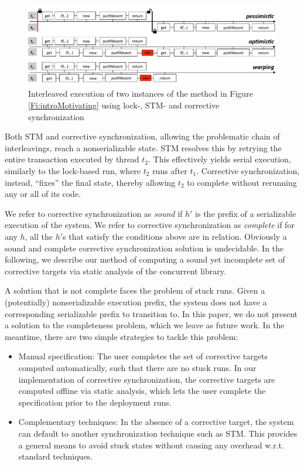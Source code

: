 \begin{figure}
	\begin{center}
	\includegraphics[width=\textwidth]{OverviewSlide.pdf}
	\end{center}
	\caption{\label{Fi:motivatingOverview}Interleaved execution of two instances of the method in Figure \ref{Fi:introMotivating} using lock-, STM- and corrective synchronization}
\end{figure}

Both STM and corrective synchronization, allowing the problematic chain of interleavings, reach a nonserializable state. STM resolves this by retrying the entire transaction executed by thread $t_2$. This effectively yields serial execution, similarly to the lock-based run, where $t_2$ runs after $t_1$. Corrective synchronization, instead, ``fixes'' the final state, thereby allowing $t_2$ to complete without rerunning any or all of its code.

We refer to corrective synchronization as \emph{sound} if $h'$ is the prefix of a serializable execution of the system. We refer to corrective synchronization as \emph{complete} if for any $h$, all the $h'$s that satisfy the conditions above are in relation. Obviously a sound and complete corrective synchronization solution is undecidable. In the following, we describe our method of computing a sound yet incomplete set of corrective targets via static analysis of the concurrent library.

A solution that is not complete faces the problem of stuck runs. Given a (potentially) nonserializable execution prefix, the system does not have a corresponding serializable prefix to transition to. In this paper, we do not present a solution to the completeness problem, which we leave as future work. In the meantime, there are two simple strategies to tackle this problem:
\begin{itemize}
	\item Manual specification: The user completes the set of corrective targets computed automatically, such that there are no stuck runs. In our implementation of corrective synchronization, the corrective targets are computed offline via static analysis, which lets the user complete the specification prior to the deployment runs.
	\item Complementary techniques: In the absence of a corrective target, the system can default to another synchronization technique such as STM. This provides a general means to avoid stuck states without causing any overhead w.r.t. standard techniques.
\end{itemize}


